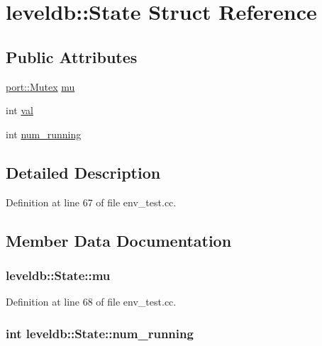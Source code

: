 \hypertarget{structleveldb_1_1_state}{}\section{leveldb\+:\+:State Struct Reference}
\label{structleveldb_1_1_state}
\subsection*{Public Attributes}
\begin{DoxyCompactItemize}
\item 
\hyperlink{classleveldb_1_1port_1_1_mutex}{port\+::\+Mutex} \hyperlink{structleveldb_1_1_state_aa5b0e460a6a87debeb211c47dce8ddd3}{mu}
\item 
int \hyperlink{structleveldb_1_1_state_adfc3479f732e7396e735991e48963981}{val}
\item 
int \hyperlink{structleveldb_1_1_state_a6e84d8550d17c6c3edda2e114a634e61}{num\+\_\+running}
\end{DoxyCompactItemize}


\subsection{Detailed Description}


Definition at line 67 of file env\+\_\+test.\+cc.



\subsection{Member Data Documentation}
\hypertarget{structleveldb_1_1_state_aa5b0e460a6a87debeb211c47dce8ddd3}{}
\subsubsection[{mu}]{ leveldb\+::\+State\+::mu}\label{structleveldb_1_1_state_aa5b0e460a6a87debeb211c47dce8ddd3}


Definition at line 68 of file env\+\_\+test.\+cc.

\hypertarget{structleveldb_1_1_state_a6e84d8550d17c6c3edda2e114a634e61}{}
\subsubsection[{num\+\_\+running}]{\setlength{\rightskip}{0pt plus 5cm}int leveldb\+::\+State\+::num\+\_\+running}\label{structleveldb_1_1_state_a6e84d8550d17c6c3edda2e114a634e61}


